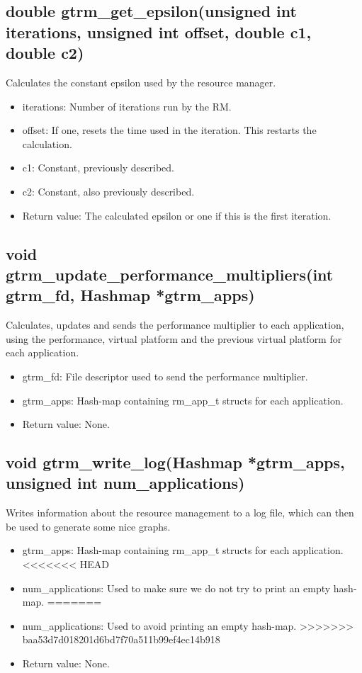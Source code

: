 \documentclass[nobiblatex]{LTHthesis}
\begin{document}
\subsection{double gtrm\_get\_epsilon(unsigned int iterations, unsigned int offset, double c1, double c2)}
Calculates the constant epsilon used by the resource manager.
\begin{itemize} 
\item iterations: Number of iterations run by the RM.
\item offset: If one, resets the time used in the iteration. This restarts the calculation.
\item c1: Constant, previously described.
\item c2: Constant, also previously described.
\item Return value: The calculated epsilon or one if this is the first iteration.
\end{itemize}

\subsection{void gtrm\_update\_performance\_multipliers(int gtrm\_fd, Hashmap *gtrm\_apps)}
Calculates, updates and sends the performance multiplier to each application, using the performance, virtual platform and the previous virtual platform for each application.
\begin{itemize} 
\item gtrm\_fd: File descriptor used to send the performance multiplier.
\item gtrm\_apps: Hash-map containing rm\_app\_t structs for each application.
\item Return value: None.
\end{itemize}

\subsection{void gtrm\_write\_log(Hashmap *gtrm\_apps, unsigned int num\_applications)}
Writes information about the resource management to a log file, which can then be used to generate some nice graphs.
\begin{itemize} 
\item gtrm\_apps: Hash-map containing rm\_app\_t structs for each application.
<<<<<<< HEAD
\item num\_applications: Used to make sure we do not try to print an empty hash-map.
=======
\item num\_applications: Used to avoid printing an empty hash-map.
>>>>>>> baa53d7d018201d6bd7f70a511b99ef4ec14b918
\item Return value: None.
\end{itemize}
\end{document}
